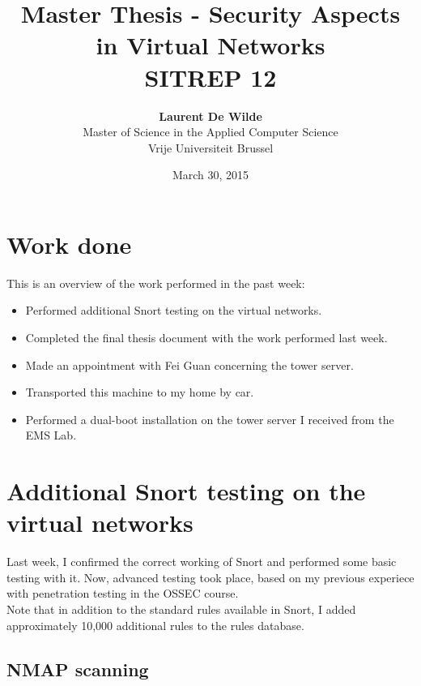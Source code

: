 \documentclass[11pt, a4paper]{article}
\title{Master Thesis -  Security Aspects in Virtual Networks\\ \textbf{SITREP 12}}
\author{\textbf{Laurent De Wilde} \\ Master of Science in the Applied Computer Science \\ Vrije Universiteit Brussel}
\date{March 30, 2015}
\begin{document}
\maketitle

\section*{Work done}

This is an overview of the work performed in the past week:
\begin{itemize}
\item Performed additional Snort testing on the virtual networks.
\item Completed the final thesis document with the work performed last week. 
\item Made an appointment with Fei Guan concerning the tower server.
\item Transported this machine to my home by car.
\item Performed a dual-boot installation on the tower server I received from the EMS Lab.
\end{itemize}

\section*{Additional Snort testing on the virtual networks}

Last week, I confirmed the correct working of Snort and performed some basic testing with it. Now, advanced testing took place, based on my previous experiece with penetration testing in the OSSEC course. \\
Note that in addition to the standard rules available in Snort, I added approximately 10,000 additional rules to the rules database.

\subsection*{NMAP scanning}
\end{document}
